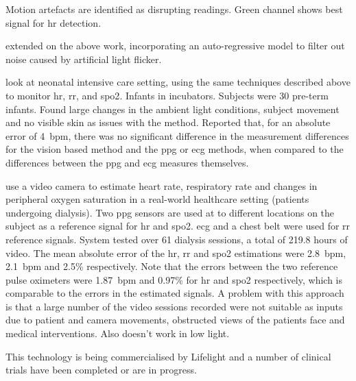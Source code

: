\documentclass[11pt, parskip=half*,twoside=false]{scrbook}
\begin{document}
Motion artefacts are identified as disrupting readings. Green channel shows best signal for \gls{hr} detection.

{\citet{tarassenkoNoncontactVideobasedVital2014} extended on the above work, incorporating an auto-regressive model to filter out noise caused by artificial light flicker. 

\citet{villarroelContinuousNoncontactVital2014} look at neonatal intensive care setting, using the same techniques described above to monitor \gls{hr}, \gls{rr}, and \gls{spo2}. Infants in incubators. Subjects were 30 pre-term infants. Found large changes in the ambient light conditions, subject movement and no visible skin as issues with the method. Reported that, for an absolute error of 4~\gls{bpm}, there was no significant difference in the measurement differences for the vision based method and the \gls{ppg} or \gls{ecg} methods, when compared to the differences between the \gls{ppg} and \gls{ecg} measures themselves.

\citet{villarroelNonContactVitalSign2017} use a video camera to estimate heart rate, respiratory rate and changes in peripheral oxygen saturation in a real-world healthcare setting (patients undergoing dialysis). Two \gls{ppg} sensors are used at to different locations on the subject as a reference signal for \gls{hr} and \gls{spo2}. \gls{ecg} and a chest belt were used for \gls{rr} reference signals. System tested over 61 dialysis sessions, a total of 219.8 hours of video. The mean absolute error of the \gls{hr}, \gls{rr} and \gls{spo2} estimations were 2.8~\gls{bpm}, 2.1~\gls{bpm} and 2.5\% respectively. Note that the errors between the two reference pulse oximeters were 1.87~\gls{bpm} and 0.97\% for \gls{hr} and \gls{spo2} respectively, which is comparable to the errors in the estimated signals.  A problem with this approach is that a large number of the video sessions recorded were not suitable as inputs due to patient and camera movements, obstructed views of the patients face and medical interventions. Also doesn't work in low light.

This technology is being commercialised by Lifelight \citep{suzanneLifelightXimLimited} and a number of clinical trials have been completed or are in progress. 


}
\end{document}

